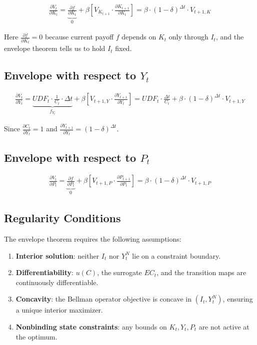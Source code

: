 \documentclass{article}
\begin{document}
\begin{align}
\frac{\partial V_t}{\partial K_t} = \underbrace{\frac{\partial f}{\partial K_t}}_{0} + \beta \left[V_{K_{t+1}} \cdot \frac{\partial K_{t+1}}{\partial K_t}\right] = \beta \cdot (1-\delta)^{\Delta t} \cdot V_{t+1,K}
\end{align}

Here $\frac{\partial f}{\partial K_t} = 0$ because current payoff $f$ depends on $K_t$ only through $I_t$, and the envelope theorem tells us to hold $I_t$ fixed.

\subsection{Envelope with respect to $Y_t$}

\begin{align}
\frac{\partial V_t}{\partial Y_t} = \underbrace{UDF_t \cdot \frac{1}{C_t} \cdot \Delta t}_{f_{Y_t}} + \beta \left[V_{t+1,Y} \cdot \frac{\partial Y_{t+1}}{\partial Y_t}\right] = UDF_t \cdot \frac{\Delta t}{C_t} + \beta \cdot (1-\delta)^{\Delta t} \cdot V_{t+1,Y}
\end{align}

Since $\frac{\partial C_t}{\partial Y_t} = 1$ and $\frac{\partial Y_{t+1}}{\partial Y_t} = (1-\delta)^{\Delta t}$.

\subsection{Envelope with respect to $P_t$}

\begin{align}
\frac{\partial V_t}{\partial P_t} = \underbrace{\frac{\partial f}{\partial P_t}}_{0} + \beta \left[V_{t+1,P} \cdot \frac{\partial P_{t+1}}{\partial P_t}\right] = \beta \cdot (1-\delta)^{\Delta t} \cdot V_{t+1,P}
\end{align}

\subsection{Regularity Conditions}

The envelope theorem requires the following assumptions:
\begin{enumerate}
\item \textbf{Interior solution}: neither $I_t$ nor $Y^N_t$ lie on a constraint boundary.
\item \textbf{Differentiability}: $u(C)$, the surrogate $EC_t$, and the transition maps are continuously differentiable.
\item \textbf{Concavity}: the Bellman operator objective is concave in $(I_t,Y^N_t)$, ensuring a unique interior maximizer.
\item \textbf{Nonbinding state constraints}: any bounds on $K_t,Y_t,P_t$ are not active at the optimum.
\end{enumerate}
\end{document}

